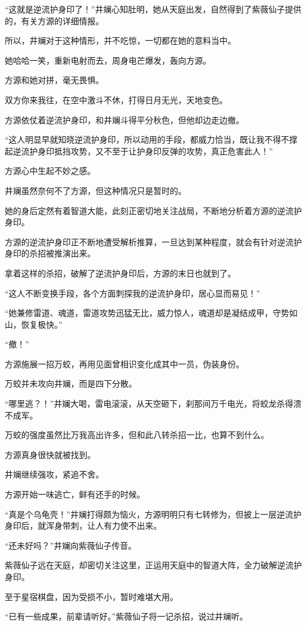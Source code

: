 \begin{this_body}
“这就是逆流护身印了！”井斓心知肚明，她从天庭出发，自然得到了紫薇仙子提供的，有关方源的详细情报。

所以，井斓对于这种情形，并不吃惊，一切都在她的意料当中。

她哈哈一笑，重新电射而去，周身电芒爆发，轰向方源。

方源和她对拼，毫无畏惧。

双方你来我往，在空中激斗不休，打得日月无光，天地变色。

方源依仗着逆流护身印，和井斓斗得平分秋色，但他却边走边撤。

“这人明显早就知晓逆流护身印，所以动用的手段，都威力恰当，既让我不得不撑起逆流护身印抵挡攻势，又不至于让护身印反弹的攻势，真正危害此人！”

方源心中生起不妙之感。

井斓虽然奈何不了方源，但这种情况只是暂时的。

她的身后定然有着智道大能，此刻正密切地关注战局，不断地分析着方源的逆流护身印。

方源的逆流护身印正不断地遭受解析推算，一旦达到某种程度，就会有针对逆流护身印的杀招被推演出来。

拿着这样的杀招，破解了逆流护身印后，方源的末日也就到了。

“这人不断变换手段，各个方面刺探我的逆流护身印，居心显而易见！”

“她兼修雷道、魂道，雷道攻势迅猛无比，威力惊人，魂道却是凝结成甲，守势如山，恢复极快。”

“撤！”

方源施展一招万蛟，再用见面曾相识变化成其中一员，伪装身份。

万蛟并未攻向井斓，而是四下分散。

“哪里逃？！”井斓大喝，雷电滚滚，从天空砸下，刹那间万千电光，将蛟龙杀得溃不成军。

万蛟的强度虽然比万我高出许多，但和此八转杀招一比，也算不到什么。

方源真身很快就被找到。

井斓继续强攻，紧追不舍。

方源开始一味逃亡，鲜有还手的时候。

“真是个乌龟壳！”井斓打得颇为恼火，方源明明只有七转修为，但披上一层逆流护身印后，就浑身带刺，让人有力使不出来。

“还未好吗？”井斓向紫薇仙子传音。

紫薇仙子远在天庭，却密切关注这里，正运用天庭中的智道大阵，全力破解逆流护身印。

至于星宿棋盘，因为受损不小，暂时难堪大用。

“已有一些成果，前辈请听好。”紫薇仙子将一记杀招，说过井斓听。


\end{this_body}
